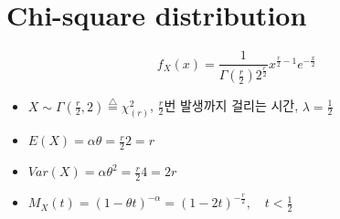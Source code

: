 \documentclass{oblivoir}
\begin{document}
\section{Chi-square distribution}
$$
f_X(x) = \frac{1}{\Gamma(\frac{r}{2}) 2^{\frac{r}{2}}} x^{\frac{r}{2} - 1} e^{-\frac{x}{2}}
$$
\begin{itemize}
\item $X \sim \Gamma(\frac{r}{2}, 2) \overset{\triangle}{=} \chi^2_{(r)}$, $\frac{r}{2}$번 발생까지 걸리는 시간, 
$\lambda = \frac{1}{2}$
\item $E(X) = \alpha \theta = \frac{r}{2} 2 = r$
\item $Var(X) = \alpha \theta^2 = \frac{r}{2} 4 = 2r$
\item $M_X(t) = (1 - \theta t)^{- \alpha} = (1 - 2t)^{-\frac{r}{2}}, \quad t < \frac{1}{2}$
\end{itemize}
\end{document}
